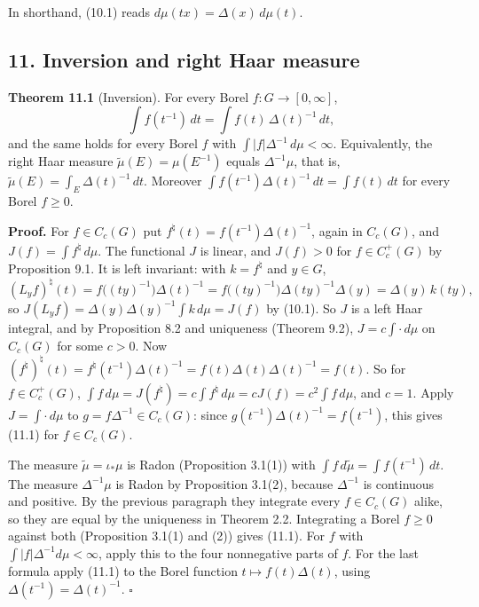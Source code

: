 \documentclass[
  english,
  11pt,
  a4paper,
]{article}
\begin{document}
In shorthand, (10.1) reads \(d\mu(tx)=\Delta(x)\,d\mu(t)\).

\subsection[11. Inversion and right Haar
measure]{\texorpdfstring{\protect\hypertarget{haar-measure-on-locally-compact-groups--oa-fnd-hm-08}{}{}11.
Inversion and right Haar
measure}{11. Inversion and right Haar measure}}\label{haar-measure-on-locally-compact-groups--OA-FND-HM-08}

\textbf{Theorem 11.1} (Inversion). For every Borel
\(f\colon G\to[0,\infty]\),
\[\int f(t^{-1})\,dt=\int f(t)\,\Delta(t)^{-1}\,dt ,
\tag{11.1}\] and the same holds for every Borel \(f\) with
\(\int|f|\Delta^{-1}\,d\mu<\infty\). Equivalently, the right Haar
measure \(\tilde\mu(E)=\mu(E^{-1})\) equals \(\Delta^{-1}\mu\), that is,
\(\tilde\mu(E)=\int_E\Delta(t)^{-1}\,dt\). Moreover
\(\int f(t^{-1})\Delta(t)^{-1}\,dt=\int f(t)\,dt\) for every Borel
\(f\geq0\).

\textbf{Proof.} For \(f\in C_c(G)\) put
\(f^\natural(t)=f(t^{-1})\Delta(t)^{-1}\), again in \(C_c(G)\), and
\(J(f)=\int f^\natural\,d\mu\). The functional \(J\) is linear, and
\(J(f)>0\) for \(f\in C_c^+(G)\) by Proposition 9.1. It is left
invariant: with \(k=f^\natural\) and \(y\in G\),
\[(L_yf)^\natural(t)=f\big((ty)^{-1}\big)\Delta(t)^{-1}=f\big((ty)^{-1}\big)\Delta(ty)^{-1}\Delta(y)=\Delta(y)\,k(ty),\]
so \(J(L_yf)=\Delta(y)\Delta(y)^{-1}\int k\,d\mu=J(f)\) by (10.1). So
\(J\) is a left Haar integral, and by Proposition 8.2 and uniqueness
(Theorem 9.2), \(J=c\int\cdot\,d\mu\) on \(C_c(G)\) for some \(c>0\).
Now
\((f^\natural)^\natural(t)=f^\natural(t^{-1})\Delta(t)^{-1}=f(t)\Delta(t)\Delta(t)^{-1}=f(t)\).
So for \(f\in C_c^+(G)\),
\(\int f\,d\mu=J(f^\natural)=c\int f^\natural\,d\mu=cJ(f)=c^2\int f\,d\mu\),
and \(c=1\). Apply \(J=\int\cdot\,d\mu\) to
\(g=f\Delta^{-1}\in C_c(G)\): since
\(g(t^{-1})\Delta(t)^{-1}=f(t^{-1})\), this gives (11.1) for
\(f\in C_c(G)\).

The measure \(\tilde\mu=\iota_*\mu\) is Radon (Proposition 3.1(1)) with
\(\int f\,d\tilde\mu=\int f(t^{-1})\,dt\). The measure
\(\Delta^{-1}\mu\) is Radon by Proposition 3.1(2), because
\(\Delta^{-1}\) is continuous and positive. By the previous paragraph
they integrate every \(f\in C_c(G)\) alike, so they are equal by the
uniqueness in Theorem 2.2. Integrating a Borel \(f\geq0\) against both
(Proposition 3.1(1) and (2)) gives (11.1). For \(f\) with
\(\int|f|\Delta^{-1}d\mu<\infty\), apply this to the four nonnegative
parts of \(f\). For the last formula apply (11.1) to the Borel function
\(t\mapsto f(t)\Delta(t)\), using \(\Delta(t^{-1})=\Delta(t)^{-1}\).
\(\square\)
\end{document}

